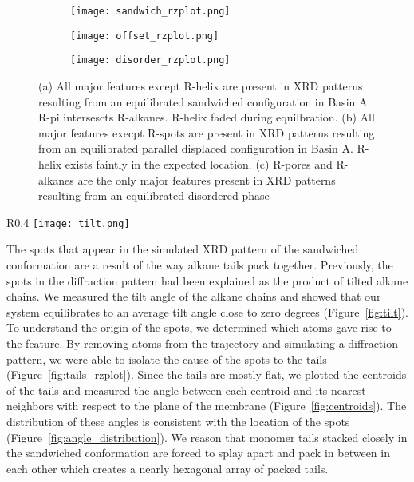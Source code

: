 \begin{figure}[H]
	\centering
	\begin{subfigure}{0.31\textwidth}
		\centering
		\hspace{-0.9cm}
		\texttt{[image: sandwich\_rzplot.png]}
		\caption{}\label{fig:sandwich_rzplot}
	\end{subfigure}
	\begin{subfigure}{0.31\textwidth}
		\centering
		\hspace{-0.9cm}
		\texttt{[image: offset\_rzplot.png]}
		\caption{}\label{fig:offsetrzplot}
	\end{subfigure}
	\begin{subfigure}{0.31\textwidth}
		\centering
		\hspace{-0.9cm}
		\texttt{[image: disorder\_rzplot.png]}
		\caption{}\label{fig:disorder_rzplot.png}
	\end{subfigure}
	\caption{(a) All major features except R-helix are present in
	XRD patterns resulting from an equilibrated sandwiched configuration 
	in Basin A. R-pi intersescts R-alkanes. R-helix faded during equilbration.
	(b) All major features execpt R-spots are present in XRD patterns 
	resulting from an equilibrated parallel displaced configuration in Basin A.
	R-helix exists faintly in the expected location. (c) R-pores and R-alkanes
	are the only major features present in XRD patterns resulting from an 
	equilibrated disordered phase}\label{fig:XRDsim}
\end{figure}

\begin{wrapfigure}{R}{0.4\textwidth}
        \centering
        \texttt{[image: tilt.png]}
        \caption{The average angle between alkane chains and the xy plane is nearly zero degrees}\label{fig:tilt}
\end{wrapfigure}

\pagebreak
The spots that appear in the simulated XRD pattern of the sandwiched
conformation are a result of the way alkane tails pack together. Previously,
the spots in the diffraction pattern had been explained as the product of
tilted alkane chains. We measured the tilt angle of the alkane chains and 
showed that our system equilibrates to an average tilt angle close to zero 
degrees (Figure~\ref{fig:tilt}). To understand the origin of the spots, we 
determined which atoms gave rise to the feature. By removing atoms from 
the trajectory and simulating a diffraction pattern, we were able to isolate
the cause of the spots to the tails (Figure~\ref{fig:tails_rzplot}). Since the tails are mostly flat, we
plotted the centroids of the tails and measured the angle between each centroid 
and its nearest neighbors with respect to the plane of the membrane (Figure~\ref{fig:centroids}). The 
distribution of these angles is consistent with the location of the spots (Figure~\ref{fig:angle_distribution}).
We reason that monomer tails stacked closely in the sandwiched conformation
are forced to splay apart and pack in between in each other which creates a
nearly hexagonal array of packed tails. 

